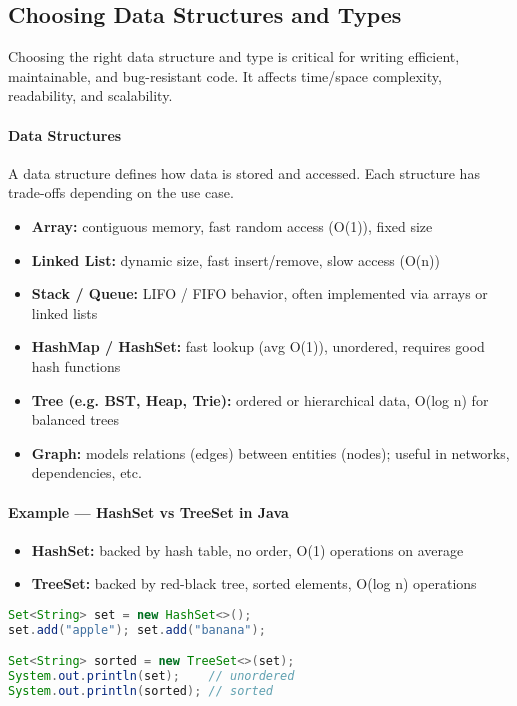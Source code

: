 \documentclass[a4paper,12pt]{article}
\begin{document}
\subsection{Choosing Data Structures and Types}

Choosing the right data structure and type is critical for writing efficient, maintainable, and bug-resistant code. It affects time/space complexity, readability, and scalability.

\paragraph{Data Structures}
A data structure defines how data is stored and accessed. Each structure has trade-offs depending on the use case.

\begin{itemize}
  \item \textbf{Array:} contiguous memory, fast random access (O(1)), fixed size
  \item \textbf{Linked List:} dynamic size, fast insert/remove, slow access (O(n))
  \item \textbf{Stack / Queue:} LIFO / FIFO behavior, often implemented via arrays or linked lists
  \item \textbf{HashMap / HashSet:} fast lookup (avg O(1)), unordered, requires good hash functions
  \item \textbf{Tree (e.g. BST, Heap, Trie):} ordered or hierarchical data, O(log n) for balanced trees
  \item \textbf{Graph:} models relations (edges) between entities (nodes); useful in networks, dependencies, etc.
\end{itemize}

\paragraph{Example — HashSet vs TreeSet in Java}
\begin{itemize}
  \item \textbf{HashSet:} backed by hash table, no order, O(1) operations on average
  \item \textbf{TreeSet:} backed by red-black tree, sorted elements, O(log n) operations
\end{itemize}

\begin{lstlisting}[language=Java]
Set<String> set = new HashSet<>();
set.add("apple"); set.add("banana");

Set<String> sorted = new TreeSet<>(set);
System.out.println(set);    // unordered
System.out.println(sorted); // sorted
\end{lstlisting}
\end{document}
